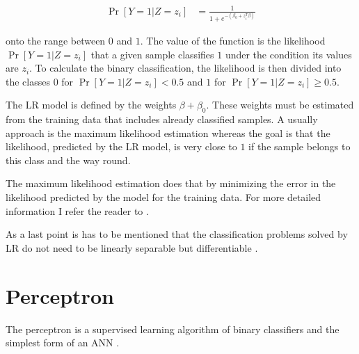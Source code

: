 \begin{align*}
\Pr[Y = 1 | Z = z_i] &= \frac{1}{1 + e^{-(\beta_0 + z^T_i \beta)}}
\end{align*}

onto the range between $0$ and $1$.
The value of the function is the likelihood $\Pr[Y = 1 | Z = z_i]$ that a given sample classifies $1$ under the condition its values are $z_i$.
To calculate the binary classification, the likelihood is then divided into the classes $0$ for $\Pr[Y = 1 | Z = z_i] < 0.5$ and $1$ for $\Pr[Y = 1 | Z = z_i] \ge 0.5$. %

The \ac{LR} model is defined by the weights $\beta + \beta_0$. %
These weights must be estimated from the training data that includes already classified samples.
A usually approach is the maximum likelihood estimation whereas the goal is that the likelihood, predicted by the \ac{LR} model, is very close to $1$ if the sample belongs to this class and the way round. %

The maximum likelihood estimation does that by minimizing the error in the likelihood predicted by the model for the training data. %
For more detailed information I refer the reader to \cite{2017MaximumEstimation}.

As a last point is has to be mentioned that the classification problems solved by \ac{LR} do not need to be linearly separable but differentiable \cite{Ruhrmair2010ModelingFunctions}.


\section{Perceptron}
\label{sec:perceptron}

The perceptron is a supervised learning algorithm of binary classifiers and the simplest form of an \ac{ANN} \cite{Rosenblatt1957TheAutomaton}. 

